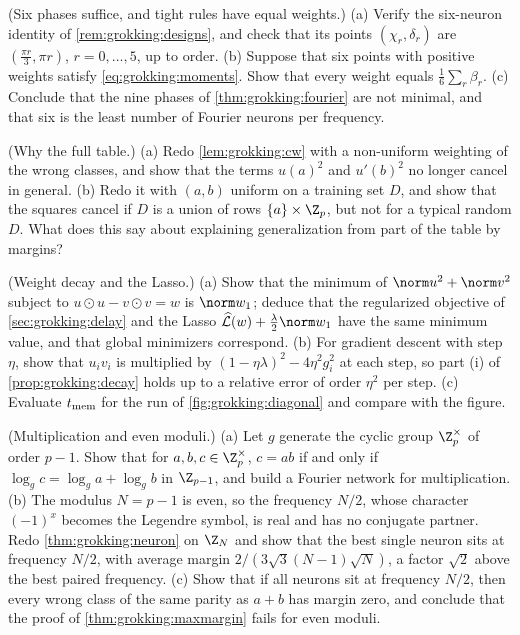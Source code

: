 \begin{refsection}
\begin{exercises}
\item \consolidation\hard (Six phases suffice, and tight rules have equal weights.) (a) Verify the six-neuron identity of \cref{rem:grokking:designs}, and check that its points $(\chi_r,\delta_r)$ are $(\frac{\pi r}3,\pi r)$, $r=0,\dots,5$, up to order. (b) Suppose that six points with positive weights satisfy \eqref{eq:grokking:moments}. Show that every weight equals $\frac16\sum_r\beta_r$. (c) Conclude that the nine phases of \cref{thm:grokking:fourier} are not minimal, and that six is the least number of Fourier neurons per frequency. \label{ex:grokking:phases}

\item \consolidation (Why the full table.) (a) Redo \cref{lem:grokking:cw} with a non-uniform weighting of the wrong classes, and show that the terms $u(a)^2$ and $u'(b)^2$ no longer cancel in general. (b) Redo it with $(a,b)$ uniform on a training set $D$, and show that the squares cancel if $D$ is a union of rows $\{a\}\times\grokZp$, but not for a typical random $D$. What does this say about explaining generalization from part of the table by margins? \label{ex:grokking:subset}

\item \consolidation (Weight decay and the Lasso.) (a) Show that the minimum of $\norm u^2+\norm v^2$ subject to $u\odot u-v\odot v=w$ is $\norm w_1$; deduce that the regularized objective of \cref{sec:grokking:delay} and the Lasso $\Lhat(w)+\frac\lambda2\norm w_1$ have the same minimum value, and that global minimizers correspond. (b) For gradient descent with step $\eta$, show that $u_iv_i$ is multiplied by $(1-\eta\lambda)^2-4\eta^2g_i^2$ at each step, so part (i) of \cref{prop:grokking:decay} holds up to a relative error of order $\eta^2$ per step. (c) Evaluate $t_{\mathrm{mem}}$ for the run of \cref{fig:grokking:diagonal} and compare with the figure. \label{ex:grokking:lasso}

\item \variation\hard (Multiplication and even moduli.) (a) Let $g$ generate the cyclic group $\grokZp^\times$ of order $p-1$. Show that for $a,b,c\in\grokZp^\times$, $c=ab$ if and only if $\log_gc=\log_ga+\log_gb$ in $\Z_{p-1}$, and build a Fourier network for multiplication. (b) The modulus $N=p-1$ is even, so the frequency $N/2$, whose character $(-1)^x$ becomes the Legendre symbol, is real and has no conjugate partner. Redo \cref{thm:grokking:neuron} on $\Z_N$ and show that the best single neuron sits at frequency $N/2$, with average margin $2/(3\sqrt3(N-1)\sqrt N)$, a factor $\sqrt2$ above the best paired frequency. (c) Show that if all neurons sit at frequency $N/2$, then every wrong class of the same parity as $a+b$ has margin zero, and conclude that the proof of \cref{thm:grokking:maxmargin} fails for even moduli. \label{ex:grokking:even}


\end{exercises}
\end{refsection}
